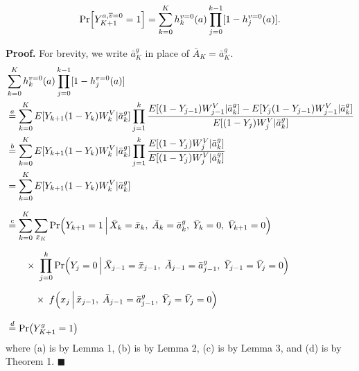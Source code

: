 \begin{tcolorbox}[title= IPW Theorem 2: Equivalence of the IPW and g-formulae] 
$$\Pr \Bigl[Y^{a,\overline{v}=0}_{K+1}=1\Bigr] = \sum_{k=0}^K h_k^{v=0}(a)\prod_{j=0}^{k-1}[1-h_j^{v=0}(a)].$$
\end{tcolorbox}

\textbf{Proof.} For brevity, we write $\bar{a}^g_K$ in place of $\bar{A}_K = \bar{a}^g_K$. 
\begin{align*}
    &\sum_{k=0}^K h_k^{v=0}(a)\prod_{j=0}^{k-1}[1-h_j^{v=0}(a)]\\
    & \stackrel{a}{=} \sum_{k=0}^K E[Y_{k+1}(1-Y_k)W_k^V|\bar{a}^g_k]\prod_{j=1}^k\frac{E[(1-Y_{j-1})W_{j-1}^V|\bar{a}^g_k]-E[Y_j(1-Y_{j-1})W_{j-1}^V|\bar{a}^g_k]}{E[(1-Y_j)W_j^V|\bar{a}^g_k]} \\
    & \stackrel{b}{=} \sum_{k=0}^K E[Y_{k+1}(1-Y_k)W_k^V|\bar{a}^g_k]\prod_{j=1}^k\frac{E[(1-Y_j)W_j^V|\bar{a}^g_k]}{E[(1-Y_j)W_j^V|\bar{a}^g_k]} \\
    & = \sum_{k=0}^K E[Y_{k+1}(1-Y_k)W_k^V|\bar{a}^g_k]\\[6pt]
    &\stackrel{c}{=}\sum_{k=0}^K\sum_{\bar{x}_K} 
        \Pr\Bigl(Y_{k+1} = 1 \,\Big|\,\bar{X}_k = \bar{x}_k,\;\bar{A}_k=\bar{a}^g_k,\; \bar{Y}_k=0,\;\bar{V}_{k+1}=0 \Bigr) \\[6pt]
    &\quad\quad \times\;
    \prod_{j=0}^{k} \Pr\Bigl(Y_j=0 \,\Big|\, \bar{X}_{j-1} = \bar{x}_{j-1},\;\bar{A}_{j-1} = \bar{a}^g_{j-1},\;\bar{Y}_{j-1} = \bar{V}_j = 0 \Bigr) \\[6pt]
    &\quad\quad\quad \times\;
      f\Bigl(x_j \,\Big|\,\bar{x}_{j-1},\;\bar{A}_{j-1} = \bar{a}^g_{j-1},\; \bar{Y}_{j} =\bar{V}_j = 0 \Bigr) \\[8pt]
    &\stackrel{d}{=} \Pr\bigl(Y_{K+1}^{g} = 1\bigr)
\end{align*}
where (a) is by Lemma 1, (b) is by Lemma 2, (c) is by Lemma 3, and (d) is by Theorem 1. \(\blacksquare\)

